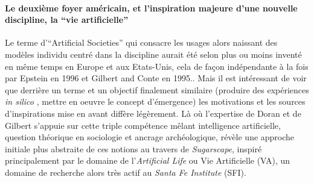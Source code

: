 






\paragraph{Le deuxième foyer américain, et l'inspiration majeure d'une nouvelle discipline, la \enquote{vie artificielle}}

Le terme d'\foreignquote{english}{Artificial Societies}  qui consacre les usages alors naissant des modèles individu centré dans la discipline aurait été selon \textcite{Gilbert2000a} plus ou moins inventé en même temps en Europe et aux Etats-Unis, cela de façon indépendante à la fois par Epstein en 1996 et Gilbert and Conte en 1995.. Mais il est intéressant de voir que derrière un terme et un objectif finalement similaire (produire des expériences \textit{in silico} , mettre en oeuvre le concept d'émergence) les motivations et les sources d'inspirations mise en avant diffère légèrement. Là où l'expertise de Doran et de Gilbert s'appuie sur cette triple compétence mêlant intelligence artificielle, question théorique en sociologie et ancrage archéologique,  \autocite[17-19]{Epstein1996} révèle une approche initiale plus abstraite de ces notions au travers de \textit{Sugarscape}, inspiré principalement par le domaine de l'\textit{Artificial Life} ou Vie Artificielle (VA), un domaine de recherche alors très actif au \textit{Santa Fe Institute} (SFI).

